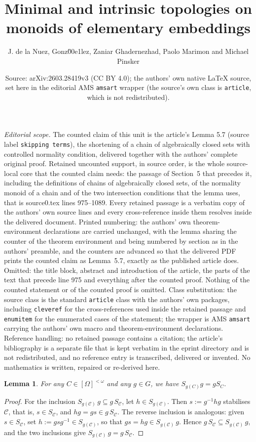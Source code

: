\documentclass[10pt,a4paper]{amsart}
\title{Minimal and intrinsic topologies on monoids of elementary embeddings}
\author{J. de la Nuez, Gonz\u00e1lez, Zaniar Ghadernezhad, Paolo Marimon and Michael Pinsker}
\date{Source: arXiv:2603.28419v3 (CC BY 4.0); the authors' own native \LaTeX{} source, set here in the editorial AMS \texttt{amsart} wrapper (the source's own class is \texttt{article}, which is not redistributed).}
\newcommand{\nn}[0]{S}
\newcommand{\C}[0]{\mathcal{C}}
\newcommand{\fps}[1]{[#1]^{<\omega}}
\theoremstyle{plain}
\newtheorem{lemma}[theorem]{Lemma}
\theoremstyle{remark}
\begin{document}
\maketitle
\noindent\textit{Editorial scope.} The counted claim of this unit is the article's Lemma 5.7 (source label \texttt{skipping terms}), the shortening of a chain of algebraically closed sets with controlled normality condition, delivered together with the authors' complete original proof. Retained uncounted support, in source order, is the whole source-local core that the counted claim needs: the passage of Section~5 that precedes it, including the definitions of chains of algebraically closed sets, of the normality monoid of a chain and of the two intersection conditions that the lemma uses, that is source0.tex lines 975--1089. Every retained passage is a verbatim copy of the authors' own source lines and every cross-reference inside them resolves inside the delivered document. Printed numbering: the authors' own theorem-environment declarations are carried unchanged, with the lemma sharing the counter of the theorem environment and being numbered by section as in the authors' preamble, and the counters are advanced so that the delivered PDF prints the counted claim as Lemma~5.7, exactly as the published article does. Omitted: the title block, abstract and introduction of the article, the parts of the text that precede line 975 and everything after the counted proof. Nothing of the counted statement or of the counted proof is omitted. Class substitution: the source class is the standard \texttt{article} class with the authors' own packages, including \texttt{cleveref} for the cross-references used inside the retained passage and \texttt{enumitem} for the enumerated cases of the statement; the wrapper is AMS \texttt{amsart} carrying the authors' own macro and theorem-environment declarations. Reference handling: no retained passage contains a citation; the article's bibliography is a separate file that is kept verbatim in the eprint directory and is not redistributed, and no reference entry is transcribed, delivered or invented. No mathematics is written, repaired or re-derived here.

\setcounter{section}{5}
\setcounter{theorem}{0}
 \begin{lemma}
 	\label{o:commutation}  For any 
   $C\in\fps{\Omega}$ 
and any $g\in G$, we have $\nn_{g(C)}g= g\nn_{C}$. 
 \end{lemma}
 \begin{proof}
 For the inclusion $\nn_{g(\C)}\,g \subseteq g\,\nn_{\C}$, let
$h \in \nn_{g(\C)}$. Then $s := g^{-1}hg$ stabilises $\C$, that is,
$s \in \nn_{\C}$, and $hg = gs \in g\,\nn_{\C}$. The reverse inclusion is
analogous: given $s \in \nn_{\C}$, set $h := gsg^{-1} \in \nn_{g(\C)}$, so
that $gs = hg \in \nn_{g(\C)}\,g$. Hence $g\,\nn_{\C} \subseteq
\nn_{g(\C)}\,g$, and the two inclusions give
$\nn_{g(\C)}\,g = g\,\nn_{\C}$.
 \end{proof}
 
\end{document}
